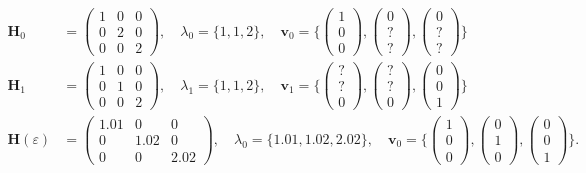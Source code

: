 \begin{align}
    \bm H_0 &=
    \begin{pmatrix}
        1 & 0 & 0\\
        0 & 2 & 0\\
        0 & 0 & 2
    \end{pmatrix},
    \quad
    \lambda_0 = \{1, 1, 2\},
    \quad
    \bm v_0 = \{
    \begin{pmatrix}
        1\\
        0\\
        0
    \end{pmatrix},
    \begin{pmatrix}
        0\\
        ?\\
        ?
    \end{pmatrix},
    \begin{pmatrix}
        0\\
        ?\\
        ?
    \end{pmatrix}
    \}
    \\
    \bm H_1 &=
    \begin{pmatrix}
        1 & 0 & 0\\
        0 & 1 & 0\\
        0 & 0 & 2
    \end{pmatrix},
    \quad
    \lambda_1 = \{1, 1, 2\},
    \quad
    \bm v_1 = \{
    \begin{pmatrix}
        ?\\
        ?\\
        0
    \end{pmatrix},
    \begin{pmatrix}
        ?\\
        ?\\
        0
    \end{pmatrix},
    \begin{pmatrix}
        0\\
        0\\
        1
    \end{pmatrix}
    \}
    \\
    \bm H(\varepsilon) &=
    \begin{pmatrix}
        1.01 & 0 & 0\\
        0 & 1.02 & 0\\
        0 & 0 & 2.02
    \end{pmatrix},
    \quad
    \lambda_0 = \{1.01, 1.02, 2.02\},
    \quad
    \bm v_0 = \{
    \begin{pmatrix}
        1\\
        0\\
        0
    \end{pmatrix},
    \begin{pmatrix}
        0\\
        1\\
        0
    \end{pmatrix},
    \begin{pmatrix}
        0\\
        0\\
        1
    \end{pmatrix}
    \}. \label{ew:eq:entartung_bsp}
\end{align}
